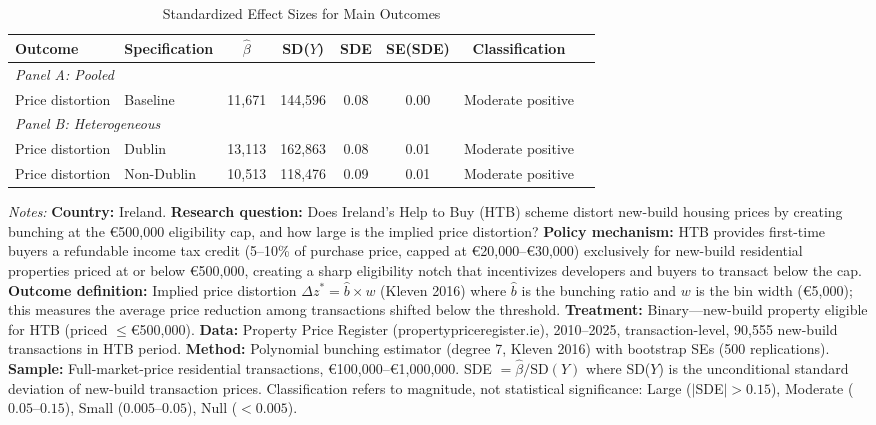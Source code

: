 \begin{table}[H]
\centering
\caption{Standardized Effect Sizes for Main Outcomes}
\label{tab:sde}
\begin{threeparttable}
\begin{tabular}{llcccccc}
\toprule
Outcome & Specification & $\hat{\beta}$ & SD($Y$) & SDE & SE(SDE) & Classification \\
\midrule
\multicolumn{7}{l}{\textit{Panel A: Pooled}} \\[3pt]
Price distortion & Baseline & 11,671 & 144,596 & 0.08 & 0.00 & Moderate positive \\
\midrule
\multicolumn{7}{l}{\textit{Panel B: Heterogeneous}} \\[3pt]
Price distortion & Dublin & 13,113 & 162,863 & 0.08 & 0.01 & Moderate positive \\
Price distortion & Non-Dublin & 10,513 & 118,476 & 0.09 & 0.01 & Moderate positive \\
\bottomrule
\end{tabular}
\begin{tablenotes}[flushleft]
\small
\item \textit{Notes:} \textbf{Country:} Ireland. \textbf{Research question:} Does Ireland's Help to Buy (HTB) scheme distort new-build housing prices by creating bunching at the \euro{}500,000 eligibility cap, and how large is the implied price distortion? \textbf{Policy mechanism:} HTB provides first-time buyers a refundable income tax credit (5--10\% of purchase price, capped at \euro{}20,000--\euro{}30,000) exclusively for new-build residential properties priced at or below \euro{}500,000, creating a sharp eligibility notch that incentivizes developers and buyers to transact below the cap. \textbf{Outcome definition:} Implied price distortion $\Delta z^* = \hat{b} \times w$ (Kleven 2016) where $\hat{b}$ is the bunching ratio and $w$ is the bin width (\euro{}5,000); this measures the average price reduction among transactions shifted below the threshold. \textbf{Treatment:} Binary---new-build property eligible for HTB (priced $\leq$\euro{}500,000). \textbf{Data:} Property Price Register (propertypriceregister.ie), 2010--2025, transaction-level, 90,555 new-build transactions in HTB period. \textbf{Method:} Polynomial bunching estimator (degree 7, Kleven 2016) with bootstrap SEs (500 replications). \textbf{Sample:} Full-market-price residential transactions, \euro{}100,000--\euro{}1,000,000. SDE $= \hat{\beta} / \text{SD}(Y)$ where SD($Y$) is the unconditional standard deviation of new-build transaction prices. Classification refers to magnitude, not statistical significance: Large ($|$SDE$| > 0.15$), Moderate ($0.05$--$0.15$), Small ($0.005$--$0.05$), Null ($< 0.005$).
\end{tablenotes}
\end{threeparttable}
\end{table}
